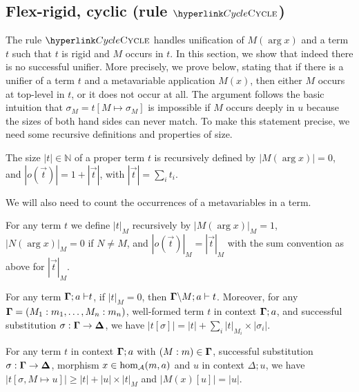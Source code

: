 \subsection[Flex-rigid, cyclic (rule Cycle)]{Flex-rigid, cyclic (rule $\protect\refrule{Cycle}$)}

\label{subsec:flex-rig-cyclic}The rule $\refrule{Cycle}$ handles
unification of $M(\arg x)$ and a term $t$ such that $t$ is rigid
and $M$ occurs in $t$. In this section, we show that indeed there
is no successful unifier. More precisely, we prove 
below, stating that if there is a unifier of a term $t$ and a metavariable
application $M(x)$, then either $M$ occurs at top-level in $t$,
or it does not occur at all. The argument follows the basic intuition
that $\sigma_{M}=t[M\mapsto\sigma_{M}]$ is impossible if $M$ occurs
deeply in $u$ because the sizes of both hand sides can never match.
To make this statement precise, we need some recursive definitions
and properties of size.
\begin{definition}
\label{def:size-occur-check}The size $|t|\in\mathbb{N}$ of a proper
term $t$ is recursively defined by $|M(\arg x)|=0$, and $|o(\vec{t})|=1+|\vec{t}|$,
with $|\vec{t}|=\sum_{i}t_{i}$.
\end{definition}
%
We will also need to count the occurrences of a metavariables in a
term.
\begin{definition}
For any term $t$ we define $|t|_{M}$ recursively by $|M(\arg x)|_{M}=1$,
$|N(\arg x)|_{M}=0$ if $N\neq M$, and $|o(\vec{t})|_{M}=|\vec{t}|_{M}$
with the sum convention as above for $|\vec{t}|_{M}$.
\end{definition}
\begin{lemma}
\label{lem:sizeM-factor}For any term $\text{\ensuremath{\dotmcontext{\Gamma};a\vdash}}t$,
if $|t|_{M}=0$, then $\dotmcontext{\Gamma}\backslash M;a\vdash t$.
Moreover, for any $\dotmcontext{\Gamma}=(M_{1}:m_{1},\dots,M_{n}:m_{n})$,
well-formed term $t$ in context $\dotmcontext{\Gamma};a$, and successful
substitution $\sigma:\dotmcontext{\Gamma}\rightarrow\dotmcontext{\Delta}$,
we have $|t[\sigma]|=|t|+\sum_{i}|t|_{M_{i}}\times|\sigma_{i}|$.
\end{lemma}
%
\begin{corollary}
\label{cor:size-consequences}For any term $t$ in context $\dotmcontext{\Gamma};a$
with $(M:m)\in\dotmcontext{\Gamma}$, successful substitution $\sigma:\dotmcontext{\Gamma}\rightarrow\dotmcontext{\Delta}$,
morphism $x\in\hom_{{\cal A}}(m,a)$ and $u$ in context $\Delta;u$,
we have $|t[\sigma,M\mapsto u]|\geq|t|+|u|\times|t|_{M}$ and $|M(x)[u]|=|u|$.
\end{corollary}
